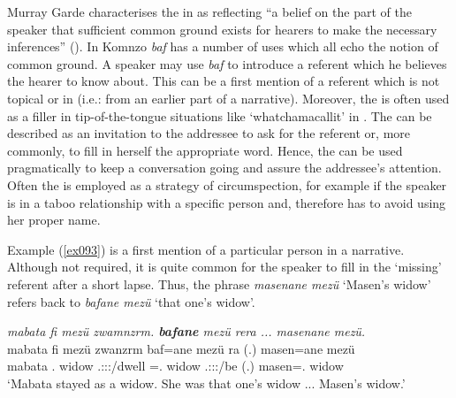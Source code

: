Murray Garde characterises the   in  as reflecting ``a belief on the part of the speaker that sufficient common ground exists for hearers to make the necessary inferences'' (\citeyear[250]{Garde:2013ut}). In Komnzo \textit{baf} has a number of uses which all echo the notion of common ground. A speaker may use \emph{baf} to introduce a referent which he believes the hearer to know about. This can be a first mention of a referent which is not topical or in  (i.e.: from an earlier part of a narrative). Moreover, the  is often used as a filler in tip-of-the-tongue situations like `whatchamacallit' in . The  can be described as an invitation to the addressee to ask for the referent or, more commonly, to fill in herself the appropriate word. Hence, the  can be used pragmatically to keep a conversation going and assure the addressee's attention. Often the  is employed as a strategy of circumspection, for example if the speaker is in a taboo relationship with a specific person and, therefore has to avoid using her proper name.%

Example (\ref{ex093}) is a first mention of a particular person in a narrative. Although not required, it is quite common for the speaker to fill in the `missing' referent after a short lapse. Thus, the phrase \emph{masenane mezü} `Masen's widow' refers back to \emph{bafane mezü} `that one's widow'.

\begin{exe}
	\ex \emph{mabata fi mezü zwamnzrm. \textbf{bafane} mezü rera ... masenane mezü.}\\
	\gll mabata fi mezü zwanzrm baf=ane mezü ra (.) masen=ane mezü\\
	mabata \Third.\Abs{} widow \Tsg{}.\F{}:\Sbj:\Pst:\Dur{}/dwell \Recog{}=\Poss.\Sg{} widow \Tsg{}.\F{}:\Sbj:\Pst:\Ipfv/be (.) masen=\Poss.\Sg{} widow\\
	\trans `Mabata stayed as a widow. She was that one's widow ... Masen's widow.' 
	\label{ex093}
\end{exe}

